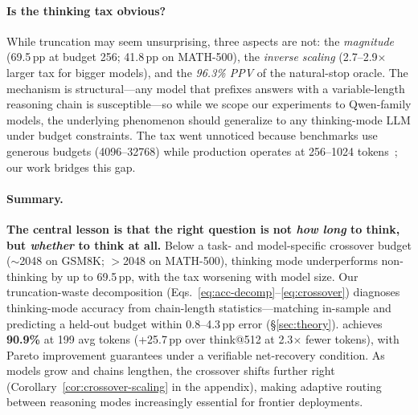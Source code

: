 
\paragraph{Is the thinking tax obvious?}
While truncation may seem unsurprising, three aspects are not: the \emph{magnitude} (69.5\,pp at budget 256; 41.8\,pp on MATH-500), the \emph{inverse scaling} (2.7--2.9$\times$ larger tax for bigger models), and the \emph{96.3\% PPV} of the natural-stop oracle.
The mechanism is structural---any model that prefixes answers with a variable-length reasoning chain is susceptible---so while we scope our experiments to Qwen-family models, the underlying phenomenon should generalize to any thinking-mode LLM under budget constraints.
The tax went unnoticed because benchmarks use generous budgets (4096--32768) while production operates at 256--1024 tokens~\citep{snell2024scaling}; our work bridges this gap.

\paragraph{Summary.}
\textbf{The central lesson is that the right question is not \emph{how long} to think, but \emph{whether} to think at all.}
Below a task- and model-specific crossover budget (${\sim}$2048 on GSM8K; ${>}$2048 on MATH-500), thinking mode underperforms non-thinking by up to 69.5\,pp, with the tax worsening with model size.
Our truncation-waste decomposition (Eqs.~\eqref{eq:acc-decomp}--\eqref{eq:crossover}) diagnoses thinking-mode accuracy from chain-length statistics---matching in-sample and predicting a held-out budget within 0.8--4.3\,pp error (\S\ref{sec:theory}).
\method{} achieves \textbf{90.9\%} at 199 avg tokens (+25.7\,pp over think@512 at 2.3$\times$ fewer tokens), with Pareto improvement guarantees under a verifiable net-recovery condition.
As models grow and chains lengthen, the crossover shifts further right (Corollary~\ref{cor:crossover-scaling} in the appendix), making adaptive routing between reasoning modes increasingly essential for frontier deployments.

